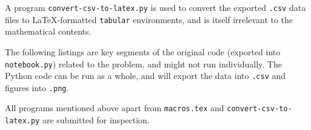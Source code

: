 \documentclass{article}
\begin{document}
A program \verb|convert-csv-to-latex.py| is used to convert the exported \verb|.csv| data files to \LaTeX-formatted \verb|tabular| environments, and is itself irrelevant to the mathematical contents.

The following listings are key segments of the original code (exported into \verb|notebook.py|) related to the problem, and might not run individually. The Python code can be run as a whole, and will export the data into \verb|.csv| and figures into \verb|.png|.

All programs mentioned above apart from \verb|macros.tex| and \verb|convert-csv-to-latex.py| are submitted for inspection.

\begin{listing}[htp]
    \inputminted[firstline=32, lastline=52]{python}{src/notebook.py}
    \caption{Code to Produce \autoref{fig:question-1-fig}}
    \label{lst:question-1-code}%
\end{listing}

\begin{listing}[htp]
    \inputminted[firstline=54, lastline=110]{python}{src/notebook.py}
    \caption{Binary Search}
    \label{lst:programming-task-binary-search}%
\end{listing}

\begin{listing}[htp]
    \inputminted[firstline=120, lastline=145]{python}{src/notebook.py}
    \caption{Fixed Point Iteration}
    \label{lst:programming-task-fixed-point}%
\end{listing}

\begin{listing}[htp]
    \inputminted[firstline=155, lastline=197]{python}{src/notebook.py}
    \caption{General Code to Produce \autoref{fig:question-3-i}, \autoref{fig:question-3-iii} and \autoref{fig:question-3-iv}}
    \label{lst:question-3-general-code-fig}%
\end{listing}

\begin{listing}[htp]
    \inputminted[firstline=199, lastline=210]{python}{src/notebook.py}
    \caption{General Code to Produce \autoref{tab:question-3-i}, \autoref{tab:question-3-iii} and \autoref{fig:question-3-iv}}
    \label{lst:question-3-general-code-tab}%
\end{listing}

\begin{listing}[htp]
    \inputminted[firstline=212, lastline=240]{python}{src/notebook.py}
    \caption{Code Related to Question 3 (i) [Similar Code for (iii) and (iv) Omitted]}
    \label{lst:question-3}%
\end{listing}
\end{document}
